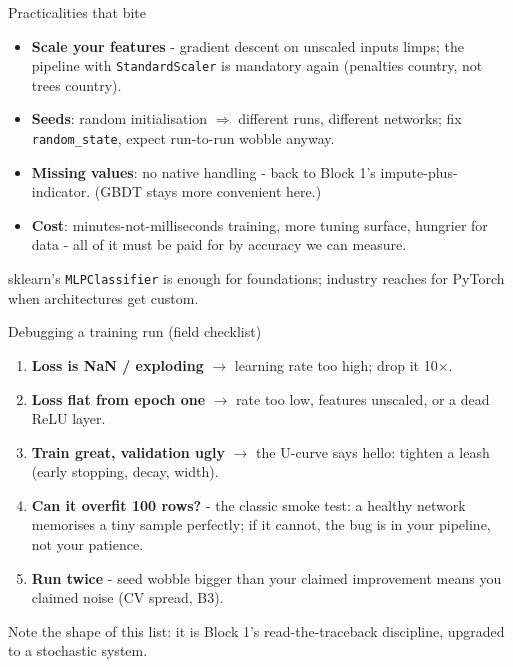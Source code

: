 \documentclass[10pt,aspectratio=169]{beamer}
\begin{document}
\begin{frame}{Practicalities that bite}
  \begin{itemize}
    \item \textbf{Scale your features} - gradient descent on unscaled
          inputs limps; the pipeline with \texttt{StandardScaler} is
          mandatory again (penalties country, not trees country).
    \item \textbf{Seeds}: random initialisation $\Rightarrow$ different
          runs, different networks; fix \texttt{random\_state}, expect
          run-to-run wobble anyway.
    \item \textbf{Missing values}: no native handling - back to Block 1's
          impute-plus-indicator. (GBDT stays more convenient here.)
    \item \textbf{Cost}: minutes-not-milliseconds training, more tuning
          surface, hungrier for data - all of it must be \alert{paid for
          by accuracy} we can measure.
  \end{itemize}
  \vspace{0.4em}
  \begin{center}\small
    sklearn's \texttt{MLPClassifier} is enough for foundations; industry
    reaches for PyTorch when architectures get custom.
  \end{center}
\end{frame}

\begin{frame}{Debugging a training run (field checklist)}
  \begin{enumerate}
    \item \textbf{Loss is NaN / exploding} $\to$ learning rate too high;
          drop it 10$\times$.
    \item \textbf{Loss flat from epoch one} $\to$ rate too low, features
          unscaled, or a dead ReLU layer.
    \item \textbf{Train great, validation ugly} $\to$ the U-curve says
          hello: tighten a leash (early stopping, decay, width).
    \item \textbf{Can it overfit 100 rows?} - the classic smoke test: a
          healthy network memorises a tiny sample \alert{perfectly}; if
          it cannot, the bug is in your pipeline, not your patience.
    \item \textbf{Run twice} - seed wobble bigger than your claimed
          improvement means you claimed noise (CV spread, B3).
  \end{enumerate}
  \vspace{0.3em}
  \begin{center}\small
    Note the shape of this list: it is Block 1's read-the-traceback
    discipline, upgraded to a stochastic system.
  \end{center}
\end{frame}
\end{document}
